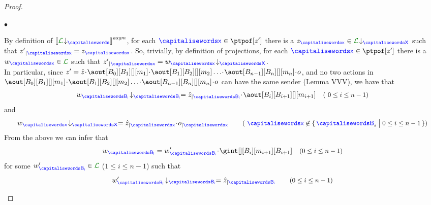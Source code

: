 \begin{proof}
\begin{description}
%
%
%
%
$\bullet$

 By definition of $\asem{\proj{\clang}{}}$, 
for each 
$\px\in\ptpof[{z'}]$  there is a $z_{\px}\in\proj{\clang}{X}$ such that
$\filter{z'}{\px}=z_{\px}$. So, trivially, by definition of projections,
for each $\px\in\ptpof[z']$  there is a $\acword_{\px}\in{\clang}$ such that
$\filter{z'}{\px}=\proj{\acword_{\px}}{X}$.\\
 In particular,
 since $z'=\hat z \cat\aout[B_0][B_1][][m_1]\cat\aout[B_1][B_2][][m_2]\ldots\cat\aout[B_{n-1}][B_n][][m_n]\cat o$, and no two actions in $\aout[B_0][B_1][][m_1]\cat\aout[B_1][B_2][][m_2]\ldots\cat\aout[B_{n-1}][B_n][][m_n]\cat o$ can have the same sender (Lemma VVV), we have that 
  $$
   \proj{\acword_{\ptp[B_{i}]}}{B_{i}}= \filter{\hat z}{\ptp[B_{i}]}\cat\aout[B_{i}][B_{i+1}][][m_{i+1}]
  \quad \text{\small ( $0\leq i \leq n-1$)}$$
  and
  $$\proj{\acword_{\px}}{X} = \filter{\hat z}{\px}\cat  \filter{o}{\px} \qquad 
   \text{\small ( $\px\not\in\Set{\q_i \sst 0\leq i\leq n-1}$)}$$
From the above  we can infer that  
$$
\acword_{\ptp[B_{i}]} = \acword'_{\ptp[B_{i}]}\cat \gint[][{B_i}][m_{i+1}][{B_{i+1}}]
 \quad \text{\small ($0\leq i \leq n-1$)}
$$
      for some $\acword'_{\ptp[B_{i}]} \in\clang$ ($1\leq i \leq n-1$) such that
$$
 \proj{\acword'_{\ptp[B_{i}]}}{B_i}= \filter{\hat z}{\ptp[B_{i}]}  \qquad \text{\small ($0\leq i \leq n-1$)} $$


\end{description}
\end{proof}

